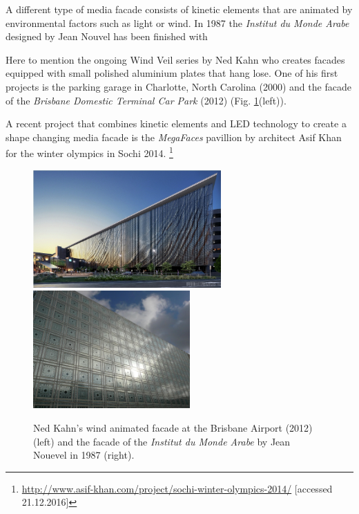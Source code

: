 A different type of media facade consists of kinetic elements that are animated by environmental factors such as light or wind. 
In 1987 the \textit{Institut du Monde Arabe}  designed by Jean Nouvel  has been finished with 

Here to mention the ongoing Wind Veil series by Ned Kahn  who creates facades equipped with small polished aluminium plates that hang lose. One of his first projects is the parking garage in Charlotte, North Carolina (2000) and the facade of the \textit{Brisbane Domestic Terminal Car Park} (2012)  (Fig. \ref{Ned_Kahn}(left)). 

A recent project that combines kinetic elements and LED technology to create a shape changing media facade is the \textit{MegaFaces}  pavillion by architect Asif Khan for the winter olympics in Sochi 2014. \footnote{ \url{http://www.asif-khan.com/project/sochi-winter-olympics-2014/} [accessed 21.12.2016]}


\begin{figure}[htp]
\centering
\includegraphics[height=4.5cm]{Illustrations/Ned_Kahn.jpg}
\includegraphics[height=4.5cm]{Illustrations/Nouvel.jpg}
\caption[Kinetic media facades]{Ned Kahn's wind animated facade at the Brisbane Airport (2012) (left) and the facade of the \textit{Institut du Monde Arabe} by Jean Nouevel in 1987 (right).}
\label{Ned_Kahn}
\end{figure}

